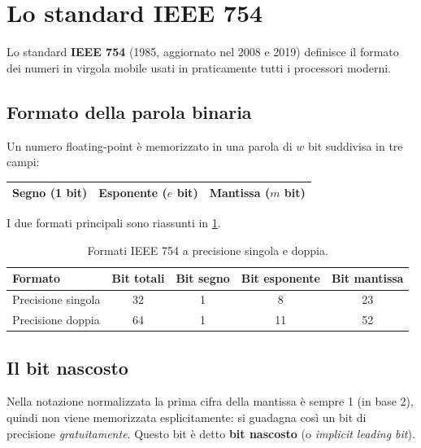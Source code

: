 \section{Lo standard IEEE 754}

Lo standard \textbf{IEEE 754} (1985, aggiornato nel 2008 e 2019) definisce il formato
dei numeri in virgola mobile usati in praticamente tutti i processori moderni.

\subsection{Formato della parola binaria}

Un numero floating-point è memorizzato in una parola di $w$ bit suddivisa in tre campi:

\begin{center}
\begin{tabular}{|c|c|c|}
\hline
\textbf{Segno} (1 bit) & \textbf{Esponente} ($e$ bit) & \textbf{Mantissa} ($m$ bit) \\
\hline
\end{tabular}
\end{center}

\medskip
I due formati principali sono riassunti in \cref{tab:ieee754}.

\begin{table}[htbp]
  \centering
  \caption{Formati IEEE 754 a precisione singola e doppia.}
  \label{tab:ieee754}
  \begin{tabular}{lcccc}
    \toprule
    \textbf{Formato} & \textbf{Bit totali} & \textbf{Bit segno} &
    \textbf{Bit esponente} & \textbf{Bit mantissa} \\
    \midrule
    Precisione singola & 32 & 1 & 8  & 23 \\
    Precisione doppia  & 64 & 1 & 11 & 52 \\
    \bottomrule
  \end{tabular}
\end{table}

\subsection{Il bit nascosto}

Nella notazione normalizzata la prima cifra della mantissa è sempre 1 (in base 2),
quindi non viene memorizzata esplicitamente: si guadagna così un bit di precisione
\emph{gratuitamente}. Questo bit è detto \textbf{bit nascosto} (o \emph{implicit
leading bit}).

